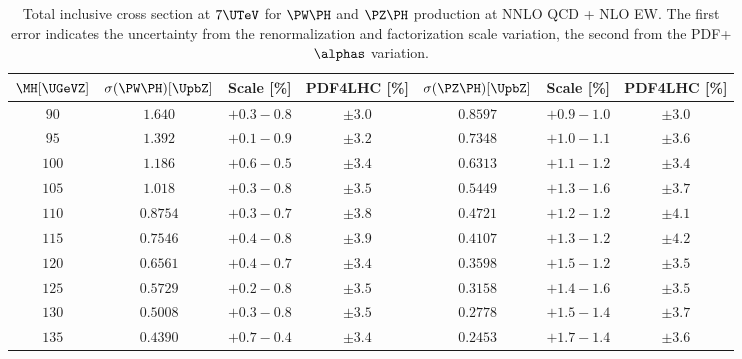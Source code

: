 \begin{table}
   \begin{center}
   \caption[]{\label{tab:wzh7}Total inclusive cross section at $7\UTeV$ for
  $\PW\PH$ and $\PZ\PH$ production at NNLO QCD + NLO EW. The first error
  indicates the uncertainty from the renormalization and factorization
  scale variation, the second from the PDF+$\alphas$ variation.}
%    
   \small
   \begin{tabular}{ccccccc}
   \hline
$\MH[\UGeVZ]$ & $\sigma(\PW\PH)[\UpbZ]$ & Scale [\%] & PDF4LHC [\%] &
$\sigma(\PZ\PH)[\UpbZ]$ & Scale [\%] & PDF4LHC [\%]
\\ \hline
$ 90 $ & $    1.640 $ & $ +0.3   -\!0.8  $ & 
$ \pm 3.0 $
 & $   0.8597 $ & $ +0.9   -\!1.0  $ &
$ \pm 3.0 $ \\[.2em]

$ 95 $ & $    1.392 $ & $ +0.1   -\!0.9  $ & 
$ \pm 3.2 $
 & $   0.7348 $ & $ +1.0   -\!1.1  $ &
$ \pm 3.6 $ \\[.2em]

$ 100 $ & $    1.186 $ & $ +0.6   -\!0.5  $ & 
$ \pm 3.4 $
 & $   0.6313 $ & $ +1.1   -\!1.2  $ &
$ \pm 3.4 $ \\[.2em]

$ 105 $ & $    1.018 $ & $ +0.3   -\!0.8  $ & 
$ \pm 3.5 $
 & $   0.5449 $ & $ +1.3   -\!1.6  $ &
$ \pm 3.7 $ \\[.2em]

$ 110 $ & $   0.8754 $ & $ +0.3   -\!0.7  $ & 
$ \pm 3.8 $
 & $   0.4721 $ & $ +1.2   -\!1.2  $ &
$ \pm 4.1 $ \\[.2em]

$ 115 $ & $   0.7546 $ & $ +0.4   -\!0.8  $ & 
$ \pm 3.9 $
 & $   0.4107 $ & $ +1.3   -\!1.2  $ &
$ \pm 4.2 $ \\[.2em]

$ 120 $ & $   0.6561 $ & $ +0.4   -\!0.7  $ & 
$ \pm 3.4 $
 & $   0.3598 $ & $ +1.5   -\!1.2  $ &
$ \pm 3.5 $ \\[.2em]

$ 125 $ & $   0.5729 $ & $ +0.2   -\!0.8  $ & 
$ \pm 3.5 $
 & $   0.3158 $ & $ +1.4   -\!1.6  $ &
$ \pm 3.5 $ \\[.2em]

$ 130 $ & $   0.5008 $ & $ +0.3   -\!0.8  $ & 
$ \pm 3.5 $
 & $   0.2778 $ & $ +1.5   -\!1.4  $ &
$ \pm 3.7 $ \\[.2em]

$ 135 $ & $   0.4390 $ & $ +0.7   -\!0.4  $ & 
$ \pm 3.4 $
 & $   0.2453 $ & $ +1.7   -\!1.4  $ &
$ \pm 3.6 $ \\[.2em]


\end{tabular}
\end{center}
\end{table}
